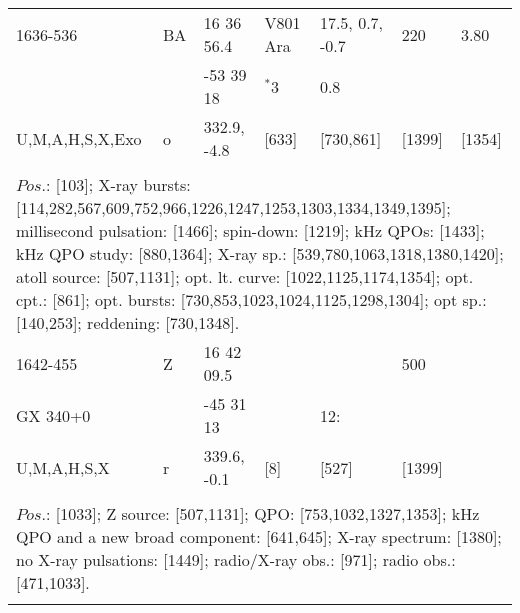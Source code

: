 \documentclass{aa}
\begin{document}
\begin{tabular}{p{2.5cm}p{1cm}p{1.8cm}p{2.3cm}p{3.3cm}p{2.0cm}p{2.2cm}}
\noalign{\smallskip}
1636-536                & BA       & 16 36 56.4          & V801 Ara      & 17.5, 0.7, -0.7         & 220       & 3.80      \\
                                 &              & -53 39 18            & $^*$3              & 0.8                           &               &               \\
U,M,A,H,S,X,Exo  & o           & 332.9, -4.8         & [633]              & [730,861]                & [1399]   & [1354]  \\
\\
\multicolumn{7}{p{17.5cm}}{
$Pos$.: [103]; X-ray bursts: [114,282,567,609,752,966,1226,1247,1253,1303,1334,1349,1395]; millisecond pulsation: 
[1466]; spin-down: [1219]; kHz QPOs: [1433]; kHz QPO study: [880,1364]; X-ray sp.: [539,780,1063,1318,1380,1420]; 
atoll source: [507,1131]; opt. lt. curve: [1022,1125,1174,1354]; opt. cpt.: [861]; opt. bursts: 
[730,853,1023,1024,1125,1298,1304]; opt sp.: [140,253]; reddening: [730,1348].}\\
\noalign{\smallskip}
\hline

\noalign{\smallskip}
1642-455        & Z           & 16 42 09.5          &                    &                         & 500       &       \\
GX 340+0       &              & -45 31 13            &                    & 12:                   &               &      \\
U,M,A,H,S,X  & r            & 339.6, -0.1          & [8]              & [527]               & [1399]  &   \\
\\
\multicolumn{7}{p{17.5cm}}{
$Pos$.: [1033]; Z source: [507,1131]; QPO: [753,1032,1327,1353]; kHz QPO and a new broad component: [641,645]; 
X-ray spectrum: [1380]; no X-ray pulsations: [1449]; radio/X-ray obs.: [971]; radio obs.: [471,1033].}\\
\noalign{\smallskip}
\hline


\end{tabular}
\end{document}
